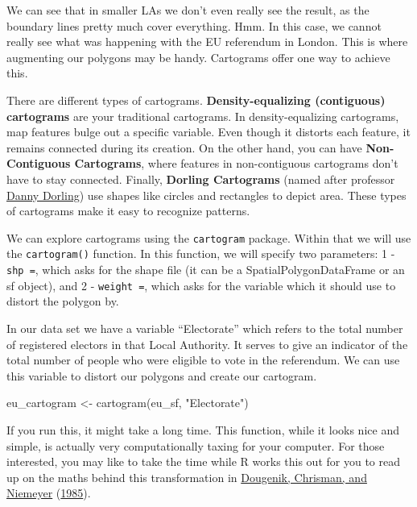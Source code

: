 \documentclass[
]{book}
\newenvironment{Shaded}{\begin{snugshade}}{\end{snugshade}}
\newcommand{\FunctionTok}[1]{\textcolor[rgb]{0.00,0.00,0.00}{#1}}
\newcommand{\NormalTok}[1]{#1}
\newcommand{\OtherTok}[1]{\textcolor[rgb]{0.56,0.35,0.01}{#1}}
\newcommand{\StringTok}[1]{\textcolor[rgb]{0.31,0.60,0.02}{#1}}
\begin{document}
We can see that in smaller LAs we don't even really see the result, as the boundary lines pretty much cover everything. Hmm. In this case, we cannot really see what was happening with the EU referendum in London. This is where augmenting our polygons may be handy. Cartograms offer one way to achieve this.

There are different types of cartograms. \textbf{Density-equalizing (contiguous) cartograms} are your traditional cartograms. In density-equalizing cartograms, map features bulge out a specific variable. Even though it distorts each feature, it remains connected during its creation. On the other hand, you can have \textbf{Non-Contiguous Cartograms}, where features in non-contiguous cartograms don't have to stay connected. Finally, \textbf{Dorling Cartograms} (named after professor \href{https://www.geog.ox.ac.uk/staff/ddorling.html}{Danny Dorling}) use shapes like circles and rectangles to depict area. These types of cartograms make it easy to recognize patterns.

We can explore cartograms using the \texttt{cartogram} package. Within that we will use the \texttt{cartogram()} function. In this function, we will specify two parameters: 1 - \texttt{shp\ =}, which asks for the shape file (it can be a SpatialPolygonDataFrame or an sf object), and 2 - \texttt{weight\ =}, which asks for the variable which it should use to distort the polygon by.

In our data set we have a variable ``Electorate'' which refers to the total number of registered electors in that Local Authority. It serves to give an indicator of the total number of people who were eligible to vote in the referendum. We can use this variable to distort our polygons and create our cartogram.

\begin{Shaded}
\begin{Highlighting}[]
\NormalTok{eu\_cartogram }\OtherTok{\textless{}{-}} \FunctionTok{cartogram}\NormalTok{(eu\_sf, }\StringTok{"Electorate"}\NormalTok{)}
\end{Highlighting}
\end{Shaded}

If you run this, it might take a long time. This function, while it looks nice and simple, is actually very computationally taxing for your computer. For those interested, you may like to take the time while R works this out for you to read up on the maths behind this transformation in \protect\hyperlink{ref-Dougenik_1985}{Dougenik, Chrisman, and Niemeyer} (\protect\hyperlink{ref-Dougenik_1985}{1985}).
\end{document}
